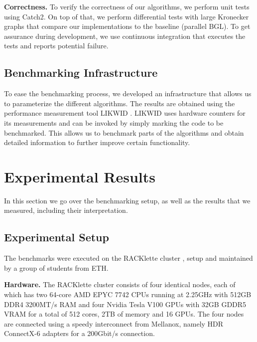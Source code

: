 \documentclass[letterpaper]{article}
\newcommand{\mypar}[1]{{\bf #1.}}
\begin{document}
\mypar{Correctness}
To verify the correctness of our algorithms, we perform unit tests using Catch2. On top of that, we perform differential
tests with large Kronecker graphs that compare our implementations to the baseline (parallel BGL). To get assurance
during development, we use continuous integration that executes the tests and reports potential failure.

\subsection{Benchmarking Infrastructure}
To ease the benchmarking process, we developed an infrastructure that allows us to parameterize the different
algorithms. The results are obtained using the performance measurement tool LIKWID \cite{treibig2010likwid}. LIKWID uses
hardware counters for its measurements and can be invoked by simply marking the code to be benchmarked. This allows us
to benchmark parts of the algorithms and obtain detailed information to further improve certain functionality.

\section{Experimental Results}
\label{sec:exp}
In this section we go over the benchmarking setup, as well as the results that we measured, including their
interpretation.

\subsection{Experimental Setup}
The benchmarks were executed on the RACKlette cluster \cite{racklette}, setup and maintained by a group of students from
ETH.

\mypar{Hardware}
The RACKlette cluster consists of four identical nodes, each of which has two 64-core AMD EPYC 7742 CPUs running at
2.25GHz with 512GB DDR4 3200MT/s RAM and four Nvidia Tesla V100 GPUs with 32GB GDDR5 VRAM for a total of 512 cores, 2TB
of memory and 16 GPUs. The four nodes are connected using a speedy interconnect from \linebreak Mellanox, namely HDR
ConnectX-6 adapters for a \linebreak 200Gbit/s connection.
\end{document}
